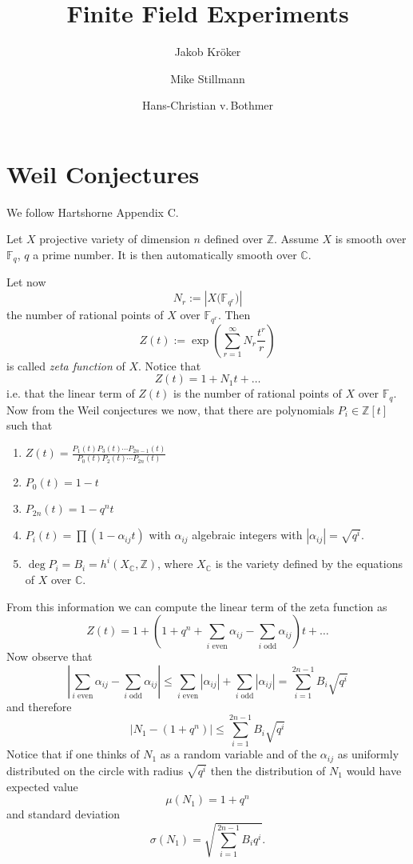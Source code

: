 \documentclass[12pt,a4paper]{amsart}
\theoremstyle{plain}
\theoremstyle{definition}
\newcommand{\FF}{\mathbb F}
\newcommand{\ZZ}{\mathbb Z}
\newcommand{\CC}{\mathbb C}
\begin{document}
\title{Finite Field Experiments}

\author{Jakob Kr\"oker}
\author{Mike Stillmann}
\author{Hans-Christian v.\,Bothmer}

\maketitle

\section{Weil Conjectures}

We follow Hartshorne Appendix C. 
\medskip

Let $X$ projective variety of dimension $n$ defined over $\ZZ$. Assume $X$ is smooth over $\FF_q$, $q$ a prime number. It is then automatically smooth over $\CC$. 

Let now
\[
	N_r := \left| X\bigl(\FF_{q^r}\bigr) \right|
\]
the number of rational points of $X$ over $\FF_{q^r}$. Then 
\[
	Z(t) := \exp \left( \sum_{r=1}^{\infty} N_r \frac{t^r}{r} \right)
\]
is called {\sl zeta function} of $X$. Notice that
\[
	Z(t) = 1 + N_1 t + \dots
\]
i.e. that the linear term of $Z(t)$ is the number of rational points of $X$ over $\FF_q$. Now from the Weil conjectures we now, that there are polynomials $P_i \in \ZZ[t]$ such that
\begin{enumerate}
\item $Z(t) = \frac{P_1(t) P_3(t) \cdots P_{2n-1}(t)}{P_0(t)P_2(t) \cdots P_{2n}(t)}$
\item $P_0(t) = 1 - t$
\item $P_{2n}(t) = 1 - q^n t$
\item $P_{i}(t) = \prod (1 - \alpha_{ij} t)$ with $\alpha_{ij}$ algebraic integers with $|\alpha_{ij}| = \sqrt{q^i}$.
\item $\deg P_{i} = B_i = h^i(X_{\CC},\ZZ)$, where $X_\CC$ is the variety defined by the equations of $X$ over $\CC$.
\end{enumerate}
From this information we can compute the linear term of the zeta function as
\[
	Z(t) = 1 + \left( 1 + q^n+ \sum_{\text{$i$ even}} \alpha_{ij} - \sum_{\text{$i$ odd}} \alpha_{ij} \right) t + \dots
\]
Now observe that
\[
	\left| \sum_{\text{$i$ even}} \alpha_{ij} - \sum_{\text{$i$ odd}} \alpha_{ij} \right| 
	\le \sum_{\text{$i$ even}} |\alpha_{ij}| + \sum_{\text{$i$ odd}} |\alpha_{ij}|  
	= \sum_{i=1}^{2n-1} B_i \sqrt{q^i}
\]
and therefore
\[
	| N_1 - (1+q^n) | \le \sum_{i=1}^{2n-1} B_i \sqrt{q^i}
\]
Notice that if one thinks of $N_1$ as a random variable and of the $\alpha_{ij}$ as uniformly distributed on the circle with radius $\sqrt{q^i}$ then the distribution of $N_1$ would have expected value
\[
	\mu(N_1) = 1+ q^n
\]
and standard deviation
\[
	\sigma(N_1) = \sqrt{\sum_{i=1}^{2n-1} B_i q^i}.
\]
\end{document}

